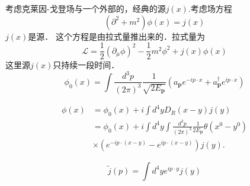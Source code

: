 
考虑克莱因-戈登场与一个外部的，经典的源$j(x)$.考虑场方程
\begin{equation}
(\partial^2+m^2)\phi(x) = j(x)
\end{equation}
$j(x)$是源． 这个方程是由拉式量推出来的．拉式量为
\begin{equation}
\mathcal L = \frac{1}{2} (\partial_\mu\phi)^2 - \frac{1}{2} m^2 \phi^2 + j(x) \phi(x)
\end{equation}
这里源$j(x)$只持续一段时间．
\begin{equation}
\phi_{0}(x)=\int \frac{d^{3} p}{(2 \pi)^{3}} \frac{1}{\sqrt{2 E_{\mathbf{p}}}}\left(a_{\mathbf{p}} e^{-i p \cdot x}+a_{\mathbf{p}}^{\dagger} e^{i p \cdot x}\right)
\end{equation}

\begin{equation}
\begin{aligned}
\phi(x) & =\phi_{0}(x)+i \int d^{4} y D_{R}(x-y) j(y) \\
& =\phi_{0}(x)+i \int d^{4} y \int \frac{d^{3} p}{(2 \pi)^{3}} \frac{1}{2 E_{\mathbf{p}}} \theta\left(x^{0}-y^{0}\right) \\
& \times\left(e^{-i p \cdot(x-y)}-e^{i p \cdot(x-y)}\right) j(y) .
\end{aligned}
\end{equation}

\begin{equation}
\tilde j (p) = \int d^4 y e^{ip \cdot y} j(y)
\end{equation}